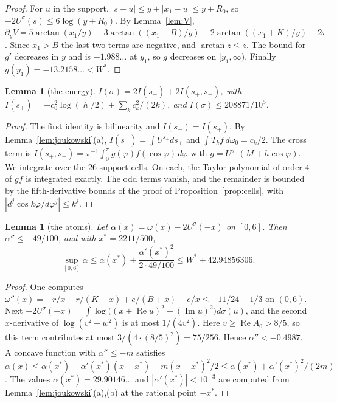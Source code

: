 \documentclass[11pt]{amsart}
\newtheorem{lemma}[theorem]{Lemma}
\theoremstyle{definition}
\theoremstyle{remark}
\numberwithin{equation}{section}
\begin{document}
\begin{proof}
For $u$ in the support, $|s-u|\le y+|x_1-u|\le y+R_0$, so $-2U^\sigma(s)\le6\log(y+R_0)$. By Lemma~\ref{lem:V},
$\partial_yV=5\arctan(x_1/y)-3\arctan((x_1-B)/y)-2\arctan((x_1+K)/y)-2\pi$. Since $x_1>B$ the last two terms are
negative, and $\arctan z\le z$. The bound for $g'$ decreases in $y$ and is $-1.988\ldots$ at $y_1$, so $g$ decreases on
$[y_1,\infty)$. Finally $g(y_1)=-13.2158\ldots<W^*$.
\end{proof}

\begin{lemma}[the energy]\label{lem:energy}
$I(\sigma)=2I(s_+)+2I(s_+,s_-)$, with $I(s_+)=-c_0^2\log(|h|/2)+\sum_kc_k^2/(2k)$, and $I(\sigma)\le208871/10^5$.
\end{lemma}

\begin{proof}
The first identity is bilinearity and $I(s_-)=I(s_+)$. By Lemma~\ref{lem:joukowski}(a),
$I(s_+)=\int U^{s_+}ds_+$ and $\int T_kf\,d\omega_0=c_k/2$. The cross term is
$I(s_+,s_-)=\pi^{-1}\int_0^\pi g(\varphi)f(\cos\varphi)\,d\varphi$ with $g=U^{s_-}(M+h\cos\varphi)$. We integrate over the
$26$ support cells. On each, the Taylor polynomial of order $4$ of $gf$ is integrated exactly. The odd terms vanish,
and the remainder is bounded by the fifth-derivative bounds of the proof of Proposition~\ref{prop:cells}, with
$|d^j\cos k\varphi/d\varphi^j|\le k^j$.
\end{proof}

\begin{lemma}[the atoms]\label{lem:atoms}
Let $\alpha(x)=\omega(x)-2U^\sigma(-x)$ on $[0,6]$. Then $\alpha''\le-49/100$, and with $x^*=2211/500$,
\[
 \sup_{[0,6]}\alpha\le\alpha(x^*)+\frac{\alpha'(x^*)^2}{2\cdot49/100}\le W^*+42.94856306 .
\]
\end{lemma}

\begin{proof}
One computes $\omega''(x)=-r/x-r/(K-x)+e/(B+x)-e/x\le-11/24-1/3$ on $(0,6)$. Next
$-2U^\sigma(-x)=\int\log\bigl((x+\operatorname{Re}u)^2+(\operatorname{Im}u)^2\bigr)d\sigma(u)$, and the second $x$-derivative
of $\log(v^2+w^2)$ is at most $1/(4v^2)$. Here $v\ge\operatorname{Re}A_0>8/5$, so this term contributes at most
$3/(4\cdot(8/5)^2)=75/256$. Hence $\alpha''<-0.4987$. A concave function with $\alpha''\le-m$ satisfies
$\alpha(x)\le\alpha(x^*)+\alpha'(x^*)(x-x^*)-m(x-x^*)^2/2\le\alpha(x^*)+\alpha'(x^*)^2/(2m)$. The values
$\alpha(x^*)=29.90146\ldots$ and $|\alpha'(x^*)|<10^{-3}$ are computed from Lemma~\ref{lem:joukowski}(a),(b) at the
rational point $-x^*$.
\end{proof}
\end{document}
